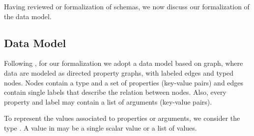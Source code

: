 

Having reviewed or formalization of schemas, we now discuss our formalization of the data model. 

\subsection{Data Model}\label{subsec:graph}
Following \HP, for our formalization we adopt a data model based on graph, where data are modeled as directed property graphs, with labeled edges and typed nodes. Nodes contain a type and a set of properties (key-value pairs) and  edges contain single labels that describe the relation between nodes. Also, every property and label may contain a list of arguments (key-value pairs).

To represent the values associated to properties or arguments, we consider the type \Vals. A value in \Vals may be a single scalar value or a list of values.

